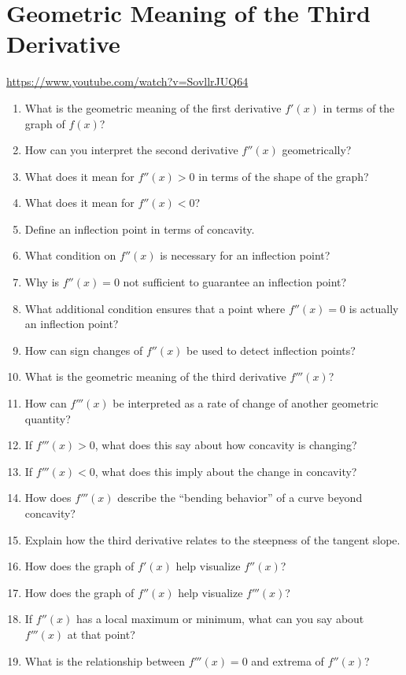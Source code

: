 \section{Geometric Meaning of the Third Derivative}

\url{https://www.youtube.com/watch?v=SovllrJUQ64}

\begin{enumerate}
  \item What is the geometric meaning of the first derivative \(f'(x)\) in terms of the graph of \(f(x)\)?
  \item How can you interpret the second derivative \(f''(x)\) geometrically?
  \item What does it mean for \(f''(x) > 0\) in terms of the shape of the graph?
  \item What does it mean for \(f''(x) < 0\)?
  \item Define an inflection point in terms of concavity.
  \item What condition on \(f''(x)\) is necessary for an inflection point?
  \item Why is \(f''(x)=0\) not sufficient to guarantee an inflection point?
  \item What additional condition ensures that a point where \(f''(x)=0\) is actually an inflection point?
  \item How can sign changes of \(f''(x)\) be used to detect inflection points?
  \item What is the geometric meaning of the third derivative \(f'''(x)\)?
  \item How can \(f'''(x)\) be interpreted as a rate of change of another geometric quantity?
  \item If \(f'''(x) > 0\), what does this say about how concavity is changing?
  \item If \(f'''(x) < 0\), what does this imply about the change in concavity?
  \item How does \(f'''(x)\) describe the “bending behavior” of a curve beyond concavity?
  \item Explain how the third derivative relates to the steepness of the tangent slope.
  \item How does the graph of \(f'(x)\) help visualize \(f''(x)\)?
  \item How does the graph of \(f''(x)\) help visualize \(f'''(x)\)?
  \item If \(f''(x)\) has a local maximum or minimum, what can you say about \(f'''(x)\) at that point?
  \item What is the relationship between \(f'''(x)=0\) and extrema of \(f''(x)\)?

\end{enumerate}
